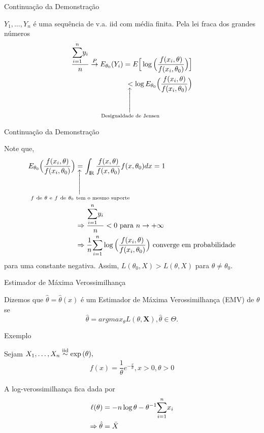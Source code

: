 \documentclass[12pt]{beamer}
\begin{document}
\begin{frame}{Continuação da Demonstração}
\begin{block}{}
\justifying
$Y_{1},\ldots,Y_{n}$ é uma sequência de v.a. iid com média finita. Pela lei fraca dos grandes números
\begin{align*}
    \dfrac{\Sumi y_{i}}{n}\ConvP E_{\theta_{0}}(Y_{i})=E\Big[\log{\Big(\dfrac{f(x_{i},\theta)}{f(x_{i},\theta_{0})}\Big)}\Big]\\
    \SetaUP{\text{Desigualdade de Jensen}}{<}\log{E_{\theta_{0}}\Big(\dfrac{f(x_{i},\theta)}{f(x_{i},\theta_{0})}\Big)}
\end{align*}
\end{block}
\end{frame}

\begin{frame}{Continuação da Demonstração}
\begin{block}{}
\justifying
Note que,
\begin{align*}
E_{\theta_{0}}\Big(\dfrac{f(x_{i},\theta)}{f(x_{i},\theta_{0})}\Big)&\SetaUP{f~\text{de}~\theta~\text{e}~f~\text{de}~\theta_{0}~\text{tem o mesmo suporte}}{=}\int_{\R} \dfrac{f(x,\theta)}{f(x,\theta_{0})}f(x,\theta_{0})dx=1\\
&\Rightarrow \dfrac{\Sumi y_{i}}{n}<0~\text{para}~n\rightarrow +\infty\\
&\Rightarrow \dfrac{1}{n}\Sumi\log{\Big(\dfrac{f(x_{i},\theta)}{f(x_{i},\theta_{0})}\Big)}~\text{converge em probabilidade}
\end{align*}
para uma constante negativa. Assim, $L(\theta_{0},X)>L(\theta,X)$ para $\theta\neq\theta_{0}.$
\end{block}
\end{frame}

\begin{frame}{Estimador de Máxima Verossimilhança}
\begin{definicao}\label{def6}
Dizemos que $\hat{\theta}=\hat{\theta}(x)$ é um Estimador de Máxima Verossimilhança (EMV) de $\theta$ se  $$\hat{\theta}=argmax_{\theta} L(\theta,\boldsymbol{X}), \hat{\theta}\in \Theta.$$
\end{definicao}
\end{frame}

\begin{frame}{Exemplo}
\begin{block}{}
\justifying
Sejam $X_{1},\ldots,X_{n}\overset{\text{iid}}{\sim} \exp{(\theta)},$ 
\begin{align*}
    f(x)=\dfrac{1}{\theta}e^{-\frac{x}{\theta}},x>0,\theta>0
\end{align*}
\end{block}
\pause
\begin{block}{}
\justifying
A log-verossimilhança fica dada por 
\begin{align*}
    \ell(\theta)&=-n\log{\theta}-\theta^{-1}{\displaystyle \sum_{i=1}^{n}} x_{i}\\
    \Rightarrow \hat{\theta}&=\Bar{X}
\end{align*}
\end{block}
\end{frame}
\end{document}
